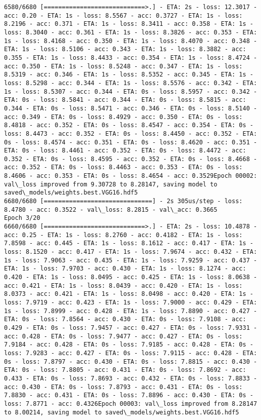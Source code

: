 \documentclass[11pt]{article}
\begin{document}
\begin{Verbatim}[commandchars=\\\{\}]
6580/6680 [============================>.] - ETA: 2s - loss: 12.3017 - acc: 0.20 - ETA: 1s - loss: 8.5567 - acc: 0.3727 - ETA: 1s - loss: 8.2196 - acc: 0.371 - ETA: 1s - loss: 8.3411 - acc: 0.358 - ETA: 1s - loss: 8.3040 - acc: 0.361 - ETA: 1s - loss: 8.3826 - acc: 0.353 - ETA: 1s - loss: 8.4168 - acc: 0.350 - ETA: 1s - loss: 8.4070 - acc: 0.348 - ETA: 1s - loss: 8.5106 - acc: 0.343 - ETA: 1s - loss: 8.3882 - acc: 0.355 - ETA: 1s - loss: 8.4433 - acc: 0.354 - ETA: 1s - loss: 8.4724 - acc: 0.350 - ETA: 1s - loss: 8.5248 - acc: 0.347 - ETA: 1s - loss: 8.5319 - acc: 0.346 - ETA: 1s - loss: 8.5352 - acc: 0.345 - ETA: 1s - loss: 8.5298 - acc: 0.344 - ETA: 1s - loss: 8.5576 - acc: 0.342 - ETA: 1s - loss: 8.5307 - acc: 0.344 - ETA: 0s - loss: 8.5957 - acc: 0.342 - ETA: 0s - loss: 8.5841 - acc: 0.344 - ETA: 0s - loss: 8.5815 - acc: 0.344 - ETA: 0s - loss: 8.5471 - acc: 0.346 - ETA: 0s - loss: 8.5140 - acc: 0.349 - ETA: 0s - loss: 8.4929 - acc: 0.350 - ETA: 0s - loss: 8.4818 - acc: 0.352 - ETA: 0s - loss: 8.4547 - acc: 0.354 - ETA: 0s - loss: 8.4473 - acc: 0.352 - ETA: 0s - loss: 8.4450 - acc: 0.352 - ETA: 0s - loss: 8.4574 - acc: 0.351 - ETA: 0s - loss: 8.4620 - acc: 0.351 - ETA: 0s - loss: 8.4461 - acc: 0.352 - ETA: 0s - loss: 8.4472 - acc: 0.352 - ETA: 0s - loss: 8.4595 - acc: 0.352 - ETA: 0s - loss: 8.4668 - acc: 0.352 - ETA: 0s - loss: 8.4463 - acc: 0.353 - ETA: 0s - loss: 8.4606 - acc: 0.353 - ETA: 0s - loss: 8.4654 - acc: 0.3529Epoch 00002: val\_loss improved from 9.30728 to 8.28147, saving model to saved\_models/weights.best.VGG16.hdf5
6680/6680 [==============================] - 2s 305us/step - loss: 8.4780 - acc: 0.3522 - val\_loss: 8.2815 - val\_acc: 0.3665
Epoch 3/20
6660/6680 [============================>.] - ETA: 2s - loss: 10.4878 - acc: 0.25 - ETA: 1s - loss: 8.2760 - acc: 0.4182 - ETA: 1s - loss: 7.8598 - acc: 0.445 - ETA: 1s - loss: 8.1612 - acc: 0.417 - ETA: 1s - loss: 8.1520 - acc: 0.417 - ETA: 1s - loss: 7.9674 - acc: 0.432 - ETA: 1s - loss: 7.9063 - acc: 0.435 - ETA: 1s - loss: 7.9259 - acc: 0.437 - ETA: 1s - loss: 7.9703 - acc: 0.430 - ETA: 1s - loss: 8.1274 - acc: 0.420 - ETA: 1s - loss: 8.0495 - acc: 0.425 - ETA: 1s - loss: 8.0638 - acc: 0.421 - ETA: 1s - loss: 8.0439 - acc: 0.420 - ETA: 1s - loss: 8.0373 - acc: 0.421 - ETA: 1s - loss: 8.0498 - acc: 0.420 - ETA: 1s - loss: 7.9719 - acc: 0.423 - ETA: 1s - loss: 7.9000 - acc: 0.429 - ETA: 1s - loss: 7.8999 - acc: 0.428 - ETA: 1s - loss: 7.8890 - acc: 0.427 - ETA: 0s - loss: 7.8564 - acc: 0.430 - ETA: 0s - loss: 7.9108 - acc: 0.429 - ETA: 0s - loss: 7.9457 - acc: 0.427 - ETA: 0s - loss: 7.9331 - acc: 0.428 - ETA: 0s - loss: 7.9477 - acc: 0.427 - ETA: 0s - loss: 7.9184 - acc: 0.428 - ETA: 0s - loss: 7.9185 - acc: 0.428 - ETA: 0s - loss: 7.9283 - acc: 0.427 - ETA: 0s - loss: 7.9115 - acc: 0.428 - ETA: 0s - loss: 7.8797 - acc: 0.430 - ETA: 0s - loss: 7.8815 - acc: 0.430 - ETA: 0s - loss: 7.8805 - acc: 0.431 - ETA: 0s - loss: 7.8692 - acc: 0.433 - ETA: 0s - loss: 7.8693 - acc: 0.432 - ETA: 0s - loss: 7.8833 - acc: 0.430 - ETA: 0s - loss: 7.8793 - acc: 0.431 - ETA: 0s - loss: 7.8830 - acc: 0.431 - ETA: 0s - loss: 7.8896 - acc: 0.430 - ETA: 0s - loss: 7.8771 - acc: 0.4326Epoch 00003: val\_loss improved from 8.28147 to 8.00214, saving model to saved\_models/weights.best.VGG16.hdf5

\end{Verbatim}
\end{document}
